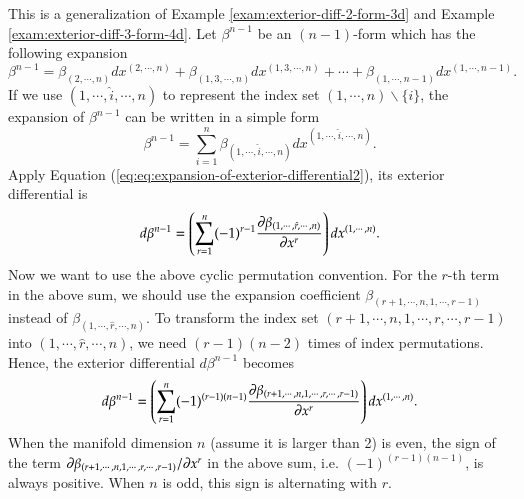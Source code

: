 \documentclass[11pt, a4paper]{book}
\begin{document}
\begin{Example}
  This is a generalization of Example \ref{exam:exterior-diff-2-form-3d} and Example
  \ref{exam:exterior-diff-3-form-4d}. Let $\beta^{n-1}$ be an $(n-1)$-form which has the
  following expansion
  \begin{equation}
    \beta^{n-1} = \beta_{(2, \cdots, n)} dx^{(2, \cdots, n)} +
    \beta_{(1,3,\cdots,n)} dx^{(1,3,\cdots,n)} + \cdots + \beta_{(1,\cdots,n-1)}
    dx^{(1,\cdots,n-1)}.
  \end{equation}
  If we use $(1,\cdots,\hat{i},\cdots,n)$ to represent the index set
  $(1,\cdots,n)\backslash \{i\}$, the expansion of $\beta^{n-1}$ can be written in a
  simple form
  \begin{equation}
    \beta^{n-1} = \sum_{i=1}^{n} \beta_{(1,\cdots,\hat{i},\cdots,n)} dx^{(1,\cdots,\hat{i},\cdots,n)}.
  \end{equation}
  Apply Equation (\ref{eq:eq:expansion-of-exterior-differential2}), its exterior
  differential is
  \begin{equation}
    d\beta^{n-1} = \left( \sum_{r=1}^n (-1)^{r-1} \frac{\partial
        \beta_{(1,\cdots,\hat{r},\cdots,n)}}{\partial x^r}
    \right) dx^{(1,\cdots,n)}.
  \end{equation}
  Now we want to use the above cyclic permutation convention. For the $r$-th term in the
  above sum, we should use the expansion coefficient $\beta_{(r+1,\cdots,n,1,\cdots,r-1)}$
  instead of $\beta_{(1,\cdots,\hat{r},\cdots,n)}$. To transform the index set
  $(r+1,\cdots,n,1,\cdots,r,\cdots,r-1)$ into $(1,\cdots,\hat{r},\cdots,n)$, we need
  $(r-1)(n-2)$ times of index permutations. Hence, the exterior differential $d\beta^{n-1}$
  becomes
  \begin{equation}
    d\beta^{n-1} = \left( \sum_{r=1}^n (-1)^{(r-1)(n-1)} \frac{\partial
        \beta_{(r+1,\cdots,n,1,\cdots,r,\cdots,r-1)}}{\partial x^r}
    \right) dx^{(1,\cdots,n)}.
  \end{equation}
  When the manifold dimension $n$ (assume it is larger than 2) is even, the sign of the
  term $\partial \beta_{(r+1,\cdots,n,1,\cdots,r,\cdots,r-1)}/\partial x^r$ in the above sum,
  i.e. $(-1)^{(r-1)(n-1)}$, is always positive. When $n$ is odd, this sign is alternating
  with $r$.
\end{Example}
\end{document}
